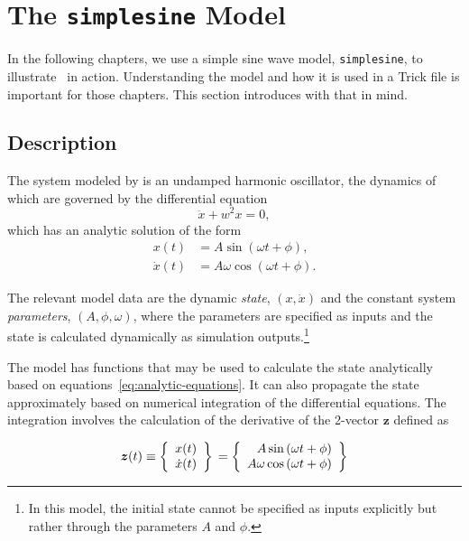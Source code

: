 \section{The {\tt simplesine} Model}
\label{sec:simplesine-model}

In the following chapters,
we use a simple sine wave model, {\tt simplesine}, to illustrate \TrickHLA\ in action.
Understanding the model and how it is used in a Trick \sdefine file
is important for those chapters.
This section introduces \simplesine with that in mind.

\subsection{Description}

The system modeled by \simplesine is an undamped harmonic oscillator,
the dynamics of which are governed by the differential equation
\begin{equation}
\ddot{x} + w^2 x = 0,
\label{eq:EOM}
\end{equation}
which has an analytic solution of the form
\begin{subequations}
\label{eq:analytic-equations}
\begin{align}
x(t)       &= A        \sin {(\omega t + \phi)}, \\
\dot{x}(t) &= A \omega \cos {(\omega t + \phi)}.
\end{align}
\end{subequations}

The relevant model data are
the dynamic {\em state}, $(x, \dot{x})$ and
the constant system {\em parameters}, $(A, \phi, \omega)$,
where the parameters are specified as inputs
and the state is calculated dynamically as simulation outputs.\footnote{
In this model, the initial state cannot be specified as inputs explicitly
but rather through the parameters $A$ and $\phi$.
}

The \simplesine model has functions that may be used to calculate the state
analytically based on equations~\ref{eq:analytic-equations}.
It can also propagate the state approximately
based on numerical integration of the differential equations.
The integration involves the calculation of the derivative of
the 2-vector $\boldsymbol{z}$ defined as

\begin{equation}
\label{eq:differential-equations}
  \boldsymbol{z}(t)
  \equiv \left\{
            \begin{array}{c}
              x(t)\\ \dot{x}(t)
            \end{array}
     \right\} \\
  = \left\{
            \begin{array}{r}
              A \sin{(\omega t + \phi)} \\ A \omega \cos{(\omega t + \phi)}
            \end{array}
     \right\}
\end{equation}

